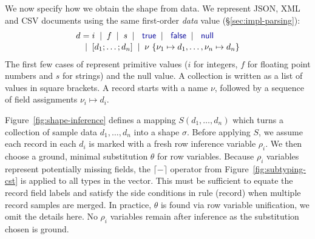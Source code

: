 \documentclass[10pt,preprint,blind,clearpagebib]{sigplanconf}
\newcommand{\kvd}[1]{\textnormal{\textcolor{kvdclr}{\sffamily #1}}}
\newcommand{\lsep}[0]{\;\; | \;\;}
\newcommand{\narrow}[1]{\hspace{-0.7em} #1 \hspace{-0.7em}}
\newcommand{\addopt}[1]{\lceil#1\rceil}
\newcommand{\semalt}[1]{S(#1)}
\begin{document}
We now specify how we obtain the shape from data. We represent JSON, XML and CSV documents using
the same first-order \emph{data} value (\S\ref{sec:impl-parsing}):
%
\begin{equation*}
\begin{array}{lcl}
 d &\narrow{=}& i \lsep f \lsep s \lsep \kvd{true} \lsep \kvd{false} \lsep \kvd{null} \\[0.1em]
   &\narrow{|}& [d_1; \ldots; d_n] \lsep \nu~\{ \nu_1 \mapsto d_1, \ldots, \nu_n \mapsto d_n \}
\end{array}
\end{equation*}
%
The first few cases of represent primitive values ($i$ for integers, $f$ for floating
point numbers and $s$ for strings) and the \kvd{null} value. A collection is written as a 
list of values in square brackets. A record starts with a name $\nu$, followed by a 
sequence of field assignments $\nu_i \mapsto d_i$.

Figure~\ref{fig:shape-inference} defines a mapping $\semalt{d_1,\ldots,d_n}$ which turns a collection of sample 
data $d_1, \ldots, d_n$ into a shape $\sigma$. Before applying $S$, we assume each record in each $d_i$ is marked with a fresh row inference
variable $\rho_i$.  
We then choose a ground, minimal substitution $\theta$ for row variables.
Because $\rho_i$ variables represent potentially missing fields,
the $\addopt{-}$ operator from Figure~\ref{fig:subtyping-cst} is applied to all types
in the vector. 
This must be sufficient to equate the record field labels and satisfy the side conditions in rule (record) when multiple record samples are merged.
In practice, $\theta$ is found via row variable unification, we omit the details here.
No $\rho_i$ variables remain after inference as the substitution chosen is ground.
\end{document}
